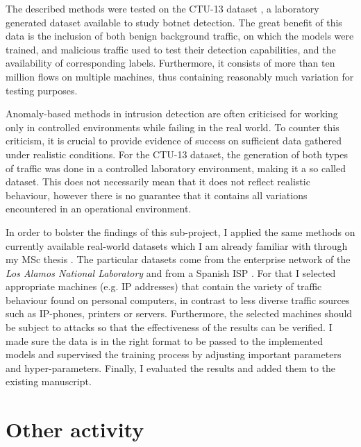 \documentclass[a4paper,12pt,twoside]{report}
\begin{document}

The described methods were tested on the CTU-13 dataset \cite{garcia2014empirical}, a laboratory generated dataset available to study botnet detection. The great benefit of this data is the inclusion of both benign background traffic, on which the models were trained, and malicious traffic used to test their detection capabilities, and the availability of corresponding labels. Furthermore, it consists of more than ten million flows on multiple machines, thus containing reasonably much variation for testing purposes.

Anomaly-based methods in intrusion detection are often criticised for working only in controlled environments while failing in the real world. To counter this criticism, it is crucial to provide evidence of success on sufficient data gathered under realistic conditions. For the CTU-13 dataset, the generation of both types of traffic was done in a controlled laboratory environment, making it a so called  dataset. This does not necessarily mean that it does not reflect realistic behaviour, however there is no guarantee that it contains all variations encountered in an operational environment. 

In order to bolster the findings of this sub-project, I applied the same methods on currently available real-world datasets which I am already familiar with through my MSc thesis \cite{clausen2018bayesian}. The particular datasets come from the enterprise network of the \textit{Los Alamos National Laboratory} \cite{kent-2015-cyberdata1} and from a Spanish ISP \cite{macia2018ugr}. For that I selected appropriate machines (e.g. IP addresses) that contain the variety of traffic behaviour found on personal computers, in contrast to less diverse traffic sources such as IP-phones, printers or servers. Furthermore, the selected machines should be subject to attacks so that the effectiveness of the results can be verified. I made sure the data is in the right format to be passed to the implemented models and supervised the training process by adjusting important parameters and hyper-parameters. Finally, I evaluated the results and added them to the existing manuscript.

\section{Other activity}
\end{document}
